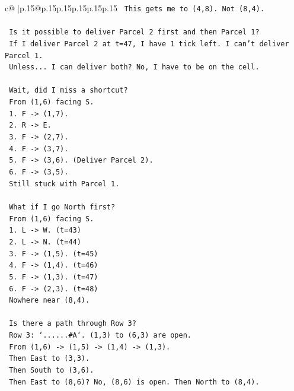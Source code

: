 \documentclass{article}
\begin{document}
{\begin{supertabular}{c@{$\;$}|p{.15\linewidth}@{}p{.15\linewidth}p{.15\linewidth}p{.15\linewidth}p{.15\linewidth}p{.15\linewidth}}
{{{\texttt{      This gets me to (4,8). Not (8,4).} \\
\\ 
\texttt{      Is it possible to deliver Parcel 2 first and then Parcel 1?} \\
\texttt{      If I deliver Parcel 2 at t=47, I have 1 tick left. I can't deliver Parcel 1.} \\
\texttt{      Unless... I can deliver both? No, I have to be on the cell.} \\
\\ 
\texttt{      Wait, did I miss a shortcut?} \\
\texttt{      From (1,6) facing S.} \\
\texttt{      1. F {-}> (1,7).} \\
\texttt{      2. R {-}> E.} \\
\texttt{      3. F {-}> (2,7).} \\
\texttt{      4. F {-}> (3,7).} \\
\texttt{      5. F {-}> (3,6). (Deliver Parcel 2).} \\
\texttt{      6. F {-}> (3,5).} \\
\texttt{      Still stuck with Parcel 1.} \\
\\ 
\texttt{      What if I go North first?} \\
\texttt{      From (1,6) facing S.} \\
\texttt{      1. L {-}> W. (t=43)} \\
\texttt{      2. L {-}> N. (t=44)} \\
\texttt{      3. F {-}> (1,5). (t=45)} \\
\texttt{      4. F {-}> (1,4). (t=46)} \\
\texttt{      5. F {-}> (1,3). (t=47)} \\
\texttt{      6. F {-}> (2,3). (t=48)} \\
\texttt{      Nowhere near (8,4).} \\
\\ 
\texttt{      Is there a path through Row 3?} \\
\texttt{      Row 3: `......\#A`. (1,3) to (6,3) are open.} \\
\texttt{      From (1,6) {-}> (1,5) {-}> (1,4) {-}> (1,3).} \\
\texttt{      Then East to (3,3).} \\
\texttt{      Then South to (3,6).} \\
\texttt{      Then East to (8,6)? No, (8,6) is open. Then North to (8,4).} \\
}}}
\end{supertabular}}
\end{document}
